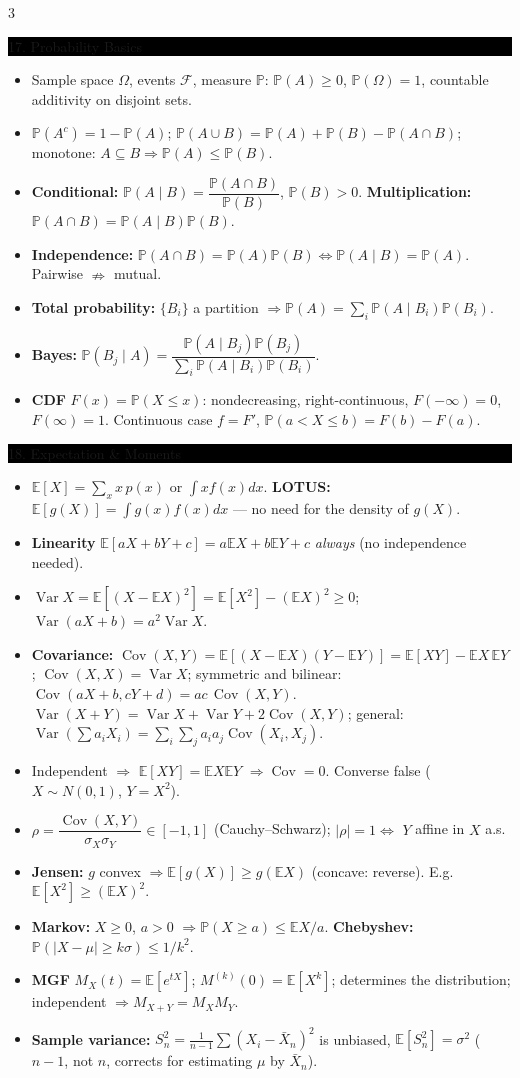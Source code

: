 \documentclass[8pt,letterpaper]{article}
\makeatletter
\newcommand{\sect}[1]{%
  \vspace{2.2pt}%
  \noindent\colorbox{black}{\parbox{\dimexpr\linewidth-2\fboxsep}{%
    \color{white}\bfseries\scshape\fontsize{6.4}{7.4}\selectfont
    \hyphenpenalty=10000\exhyphenpenalty=10000\raggedright #1}}%
  \vspace{1.4pt}\par\nopagebreak\@afterheading}
\newenvironment{tl}
  {\begin{itemize}[leftmargin=6pt,itemsep=0.3pt,topsep=1pt,parsep=0pt,
                   partopsep=0pt,label=\textcolor{gray}{\tiny$\bullet$}]}
  {\end{itemize}}
\newcommand{\E}{\mathbb{E}}
\newcommand{\PP}{\mathbb{P}}
\newcommand{\Var}{\operatorname{Var}}
\newcommand{\Cov}{\operatorname{Cov}}
\makeatother
\begin{document}
\begin{multicols}{3}
\sect{17. Probability Basics}
\begin{tl}
\item Sample space $\Omega$, events $\mathcal F$, measure $\PP$: $\PP(A)\ge0$, $\PP(\Omega)=1$, countable additivity on disjoint sets.
\item $\PP(A^c)=1-\PP(A)$; $\PP(A\cup B)=\PP(A)+\PP(B)-\PP(A\cap B)$; monotone: $A\subseteq B\Rightarrow\PP(A)\le\PP(B)$.
\item \textbf{Conditional:} $\PP(A\mid B)=\dfrac{\PP(A\cap B)}{\PP(B)}$, $\PP(B)>0$. \textbf{Multiplication:} $\PP(A\cap B)=\PP(A\mid B)\PP(B)$.
\item \textbf{Independence:} $\PP(A\cap B)=\PP(A)\PP(B)\iff\PP(A\mid B)=\PP(A)$. Pairwise $\nRightarrow$ mutual.
\item \textbf{Total probability:} $\{B_i\}$ a partition $\Rightarrow\PP(A)=\sum_i\PP(A\mid B_i)\PP(B_i)$.
\item \textbf{Bayes:} $\PP(B_j\mid A)=\dfrac{\PP(A\mid B_j)\PP(B_j)}{\sum_i\PP(A\mid B_i)\PP(B_i)}$.
\item \textbf{CDF} $F(x)=\PP(X\le x)$: nondecreasing, right-continuous, $F(-\infty)=0$, $F(\infty)=1$. Continuous case $f=F'$, $\PP(a<X\le b)=F(b)-F(a)$.
\end{tl}

\sect{18. Expectation \& Moments}
\begin{tl}
\item $\E[X]=\sum_x x\,p(x)$ or $\int x f(x)dx$. \textbf{LOTUS:} $\E[g(X)]=\int g(x)f(x)dx$ --- no need for the density of $g(X)$.
\item \textbf{Linearity} $\E[aX+bY+c]=a\E X+b\E Y+c$ \emph{always} (no independence needed).
\item $\Var X=\E[(X-\E X)^2]=\E[X^2]-(\E X)^2\ge0$; $\Var(aX+b)=a^2\Var X$.
\item \textbf{Covariance:} $\Cov(X,Y)=\E[(X-\E X)(Y-\E Y)]=\E[XY]-\E X\,\E Y$; $\Cov(X,X)=\Var X$; symmetric and bilinear: $\Cov(aX+b,cY+d)=ac\,\Cov(X,Y)$. $\Var(X+Y)=\Var X+\Var Y+2\Cov(X,Y)$; general: $\Var(\sum a_iX_i)=\sum_i\sum_j a_ia_j\Cov(X_i,X_j)$.
\item Independent $\Rightarrow$ $\E[XY]=\E X\E Y$ $\Rightarrow\Cov=0$. \colorbox{black!12}{Converse false} ($X\sim N(0,1)$, $Y=X^2$).
\item $\rho=\dfrac{\Cov(X,Y)}{\sigma_X\sigma_Y}\in[-1,1]$ (Cauchy--Schwarz); $|\rho|=1\iff$ $Y$ affine in $X$ a.s.
\item \textbf{Jensen:} $g$ convex $\Rightarrow\E[g(X)]\ge g(\E X)$ (concave: reverse). E.g.\ $\E[X^2]\ge(\E X)^2$.
\item \textbf{Markov:} $X\ge0$, $a>0$ $\Rightarrow\PP(X\ge a)\le\E X/a$. \textbf{Chebyshev:} $\PP(|X-\mu|\ge k\sigma)\le1/k^2$.
\item \textbf{MGF} $M_X(t)=\E[e^{tX}]$; $M^{(k)}(0)=\E[X^k]$; determines the distribution; independent $\Rightarrow M_{X+Y}=M_XM_Y$.
\item \textbf{Sample variance:} $S_n^2=\frac1{n-1}\sum(X_i-\bar X_n)^2$ is unbiased, $\E[S_n^2]=\sigma^2$ ($n-1$, not $n$, corrects for estimating $\mu$ by $\bar X_n$).
\end{tl}


\end{multicols}
\end{document}
